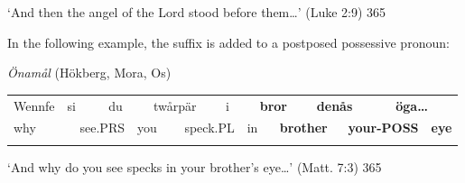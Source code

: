 \begin{styleTranslation}
‘And then the angel of the Lord stood before them…’ (Luke 2:9) 365

\end{styleTranslation}

\begin{styleBodytextC}
In the following example, the suffix is added to a postposed possessive pronoun:

\end{styleBodytextC}

\begin{listWWNumileveli}
\item 

\begin{styleExample}
\textit{Önamål} (Hökberg, Mora, Os)

\end{styleExample}

\end{listWWNumileveli}

\begin{tabular}{llllllllllllllll}
\lsptoprule
Wennfe & \multicolumn{2}{l}{si

} & \multicolumn{2}{l}{du

} & \multicolumn{2}{l}{twårpär

} & \multicolumn{2}{l}{i

} & \multicolumn{2}{l}{{\bfseries bror}

} & \multicolumn{2}{l}{{\bfseries denås}

} & \multicolumn{2}{l}{{\bfseries öga…}

} & \\
\multicolumn{2}{l}{why

} & \multicolumn{2}{l}{see.PRS

} & \multicolumn{2}{l}{you

} & \multicolumn{2}{l}{speck.PL

} & \multicolumn{2}{l}{in

} & \multicolumn{2}{l}{{\bfseries brother}

} & \multicolumn{2}{l}{{\bfseries your-POSS}

} & \multicolumn{2}{l}{{\bfseries eye}

}\\
\lspbottomrule
\end{tabular}

\begin{styleTranslation}
‘And why do you see specks in your brother’s eye…’ (Matt. 7:3) 365

\end{styleTranslation}

